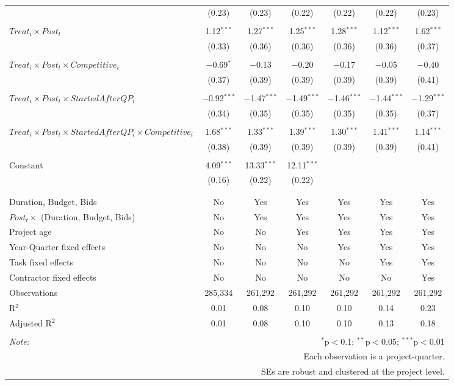 \documentclass[
]{article}
\begin{document}
\begin{table}[H]
\begin{tabular}{@{\extracolsep{-3pt}}lcccccc}
  & (0.23) & (0.23) & (0.22) & (0.22) & (0.22) & (0.23) \\ 
  & & & & & & \\ 
 $Treat_i \times Post_t$ & 1.12$^{***}$ & 1.27$^{***}$ & 1.25$^{***}$ & 1.28$^{***}$ & 1.12$^{***}$ & 1.62$^{***}$ \\ 
  & (0.33) & (0.36) & (0.36) & (0.36) & (0.36) & (0.37) \\ 
  & & & & & & \\ 
 $Treat_i \times Post_t \times Competitive_i$ & $-$0.69$^{*}$ & $-$0.13 & $-$0.20 & $-$0.17 & $-$0.05 & $-$0.40 \\ 
  & (0.37) & (0.39) & (0.39) & (0.39) & (0.39) & (0.41) \\ 
  & & & & & & \\ 
 $Treat_i \times Post_t \times StartedAfterQP_i$ & $-$0.92$^{***}$ & $-$1.47$^{***}$ & $-$1.49$^{***}$ & $-$1.46$^{***}$ & $-$1.44$^{***}$ & $-$1.29$^{***}$ \\ 
  & (0.34) & (0.35) & (0.35) & (0.35) & (0.35) & (0.37) \\ 
  & & & & & & \\ 
 $Treat_i \times Post_t \times StartedAfterQP_i \times Competitive_i$ & 1.68$^{***}$ & 1.33$^{***}$ & 1.39$^{***}$ & 1.30$^{***}$ & 1.41$^{***}$ & 1.14$^{***}$ \\ 
  & (0.38) & (0.39) & (0.39) & (0.39) & (0.39) & (0.41) \\ 
  & & & & & & \\ 
 Constant & 4.09$^{***}$ & 13.33$^{***}$ & 12.11$^{***}$ &  &  &  \\ 
  & (0.16) & (0.22) & (0.22) &  &  &  \\ 
  & & & & & & \\ 
\hline \\[-1.8ex] 
Duration, Budget, Bids & No & Yes & Yes & Yes & Yes & Yes \\ 
$Post_t \times $  (Duration, Budget, Bids) & No & Yes & Yes & Yes & Yes & Yes \\ 
Project age & No & No & Yes & Yes & Yes & Yes \\ 
Year-Quarter fixed effects & No & No & No & Yes & Yes & Yes \\ 
Task fixed effects & No & No & No & No & Yes & Yes \\ 
Contractor fixed effects & No & No & No & No & No & Yes \\ 
Observations & 285,334 & 261,292 & 261,292 & 261,292 & 261,292 & 261,292 \\ 
R$^{2}$ & 0.01 & 0.08 & 0.10 & 0.10 & 0.14 & 0.23 \\ 
Adjusted R$^{2}$ & 0.01 & 0.08 & 0.10 & 0.10 & 0.13 & 0.18 \\ 
\hline 
\hline \\[-1.8ex] 
\textit{Note:}  & \multicolumn{6}{r}{$^{*}$p$<$0.1; $^{**}$p$<$0.05; $^{***}$p$<$0.01} \\ 
 & \multicolumn{6}{r}{Each observation is a project-quarter.} \\ 
 & \multicolumn{6}{r}{SEs are robust and clustered at the project level.} \\ 
\end{tabular} 
\end{table}
\end{document}
